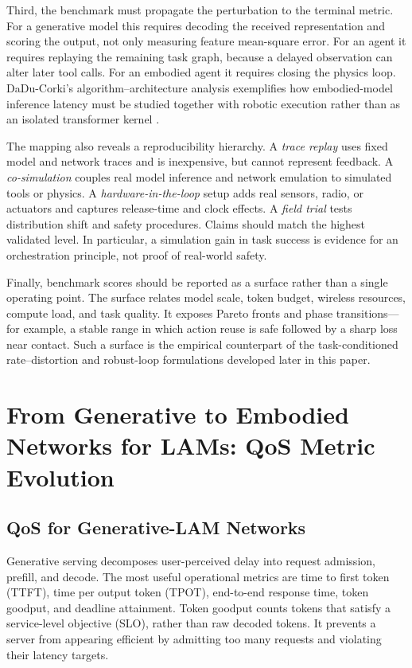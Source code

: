 \documentclass[letterpaper,journal]{IEEEtran}
\begin{document}
Third, the benchmark must propagate the perturbation to the terminal metric.
For a generative model this requires decoding the received representation and
scoring the output, not only measuring feature mean-square error. For an agent
it requires replaying the remaining task graph, because a delayed observation
can alter later tool calls. For an embodied agent it requires closing the
physics loop. DaDu-Corki's algorithm--architecture analysis exemplifies how
embodied-model inference latency must be studied together with robotic
execution rather than as an isolated transformer kernel \cite{dadu}.

The mapping also reveals a reproducibility hierarchy. A \emph{trace replay}
uses fixed model and network traces and is inexpensive, but cannot represent
feedback. A \emph{co-simulation} couples real model inference and network
emulation to simulated tools or physics. A \emph{hardware-in-the-loop} setup
adds real sensors, radio, or actuators and captures release-time and clock
effects. A \emph{field trial} tests distribution shift and safety procedures.
Claims should match the highest validated level. In particular, a simulation
gain in task success is evidence for an orchestration principle, not proof of
real-world safety.

Finally, benchmark scores should be reported as a surface rather than a
single operating point. The surface relates model scale, token budget,
wireless resources, compute load, and task quality. It exposes Pareto fronts
and phase transitions---for example, a stable range in which action reuse is
safe followed by a sharp loss near contact. Such a surface is the empirical
counterpart of the task-conditioned rate--distortion and robust-loop
formulations developed later in this paper.

\section{From Generative to Embodied Networks for LAMs: QoS Metric Evolution}
\label{sec:qos}

\subsection{QoS for Generative-LAM Networks}
Generative serving decomposes user-perceived delay into request admission,
prefill, and decode. The most useful operational metrics are time to first
token (TTFT), time per output token (TPOT), end-to-end response time, token
goodput, and deadline attainment. Token goodput counts tokens that satisfy a
service-level objective (SLO), rather than raw decoded tokens. It prevents a
server from appearing efficient by admitting too many requests and violating
their latency targets.
\end{document}
